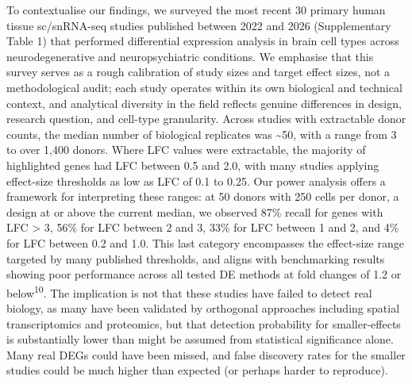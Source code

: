 \documentclass[
]{article}
\begin{document}
To contextualise our findings, we surveyed the most recent 30 primary
human tissue sc/snRNA-seq studies published between 2022 and 2026
(Supplementary Table 1) that performed differential expression analysis
in brain cell types across neurodegenerative and neuropsychiatric
conditions. We emphasise that this survey serves as a rough calibration
of study sizes and target effect sizes, not a methodological audit; each
study operates within its own biological and technical context, and
analytical diversity in the field reflects genuine differences in
design, research question, and cell-type granularity. Across studies
with extractable donor counts, the median number of biological
replicates was \textasciitilde50, with a range from 3 to over 1,400
donors. Where LFC values were extractable, the majority of highlighted
genes had \textbar LFC\textbar{} between 0.5 and 2.0, with many studies
applying effect-size thresholds as low as \textbar LFC\textbar{} of 0.1
to 0.25. Our power analysis offers a framework for interpreting these
ranges: at 50 donors with 250 cells per donor, a design at or above the
current median, we observed 87\% recall for genes with
\textbar LFC\textbar{} \textgreater{} 3, 56\% for \textbar LFC\textbar{}
between 2 and 3, 33\% for \textbar LFC\textbar{} between 1 and 2, and
4\% for \textbar LFC\textbar{} between 0.2 and 1.0. This last category
encompasses the effect-size range targeted by many published thresholds,
and aligns with benchmarking results showing poor performance across all
tested DE methods at fold changes of 1.2 or below\textsuperscript{10}.
The implication is not that these studies have failed to detect real
biology, as many have been validated by orthogonal approaches including
spatial transcriptomics and proteomics, but that detection probability
for smaller-effects is substantially lower than might be assumed from
statistical significance alone. Many real DEGs could have been missed,
and false discovery rates for the smaller studies could be much higher
than expected (or perhaps harder to reproduce).
\end{document}
